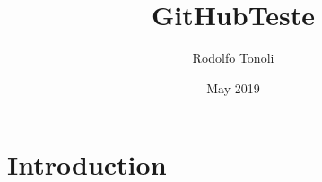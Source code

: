 \documentclass{article}
\title{GitHubTeste}
\author{Rodolfo Tonoli}
\date{May 2019}
\begin{document}
\maketitle

\section{Introduction}
\end{document}
